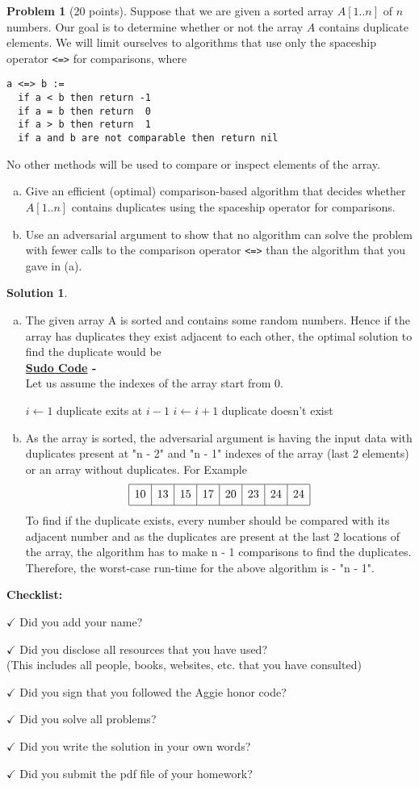 \documentclass{article}
\theoremstyle{definition}
\newtheorem{problem}{Problem}
\newtheorem*{solution}{Solution}
\newcommand{\checklist}{\noindent\textbf{Checklist:}
\begin{compactitem}[$\Box$] 
\item [$\checkmark$] Did you add your name? 
\item [$\checkmark$] Did you disclose all resources that you have used? \\
(This includes all people, books, websites, etc. that you have consulted)
\item [$\checkmark$] Did you sign that you followed the Aggie honor code? 
\item [$\checkmark$] Did you solve all problems? 
\item [$\checkmark$] Did you write the solution in your own words? 
\item [$\checkmark$] Did you submit the pdf file of your homework?
\end{compactitem}
}
\begin{document}
\begin{problem}[20 points]
Suppose that we are given a sorted array $A[1..n]$ of $n$ numbers. Our
goal is to determine whether or not the array $A$ contains
duplicate elements. We will limit ourselves to algorithms that use only the spaceship
operator \verb|<=>| for comparisons, where 
\begin{verbatim}
a <=> b :=
  if a < b then return -1
  if a = b then return  0
  if a > b then return  1
  if a and b are not comparable then return nil
\end{verbatim}
No other methods will be used to compare or inspect elements of the
array. 
\begin{enumerate}[(a)]
\item Give an efficient (optimal) comparison-based algorithm that decides
  whether $A[1..n]$ contains duplicates using the spaceship operator
  for comparisons. 
\item Use an adversarial argument to show that no algorithm can solve
  the problem with fewer calls to the comparison operator \verb|<=>|
  than the algorithm that you gave in (a). 
\end{enumerate}
\end{problem}
\begin{solution}
\begin{enumerate}[(a)]
\item The given array A is sorted and contains some random numbers. Hence if the array has duplicates they exist adjacent to each other, the optimal solution to find the duplicate would be \\
\textbf{\underline{Sudo Code} -} \\
Let us assume the indexes of the array start from 0.
\begin{algorithmic}
\State $i \leftarrow 1$
    \State \Return duplicate exits at $i - 1$
\EndIf
\State $i \leftarrow i + 1$
\EndWhile
\State \Return duplicate doesn't exist
\end{algorithmic}

\item As the array is sorted, the adversarial argument is having the input data with duplicates present at "n - 2" and "n - 1" indexes of the array (last 2 elements) or an array without duplicates. For Example 
$$ 
\begin{array}{|c|c|c|c|c|c|c|c|}
\hline
\vphantom{\Big|}10&13&15&17&20&23&24&24\\
\hline
\end{array}
$$
To find if the duplicate exists, every number should be compared with its adjacent number and as the duplicates are present at the last 2 locations of the array, the algorithm has to make n - 1 comparisons to find the duplicates. Therefore, the worst-case run-time for the above algorithm is - "n - 1".
\end{enumerate}
\end{solution}

\medskip
\goodbreak
\checklist
\end{document}
